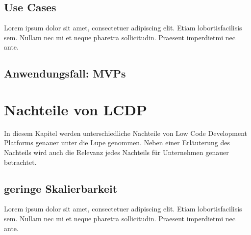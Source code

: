 \documentclass{article}
\begin{document}
	\subsection{Use Cases}	
	
	
	
	 
	Lorem  ipsum  dolor  sit  amet,  consectetuer  adipiscing  
	elit.   Etiam  lobortisfacilisis sem.  Nullam nec mi et 
	neque pharetra sollicitudin.  Praesent imperdietmi nec ante.
	
	
	\subsection{Anwendungsfall: MVPs} 
	
	\section{Nachteile von LCDP}
	
	In diesem Kapitel werden unterschiedliche Nachteile von Low Code Development Platforms genauer unter die Lupe genommen. Neben einer Erläuterung des Nachteils wird auch die Relevanz jedes Nachteils für Unternehmen genauer betrachtet. %
		
	\subsection{geringe Skalierbarkeit}	
	Lorem  ipsum  dolor  sit  amet,  consectetuer  adipiscing  
	elit.   Etiam  lobortisfacilisis sem.  Nullam nec mi et 
	neque pharetra sollicitudin.  Praesent imperdietmi nec ante.
	
\end{document}

